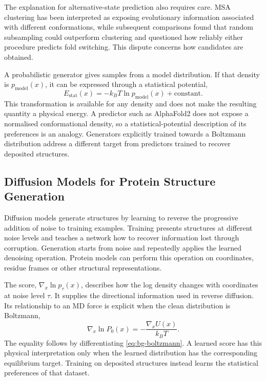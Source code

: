 The explanation for alternative-state prediction also requires care. MSA clustering has been interpreted as exposing evolutionary information associated with different conformations, while subsequent comparisons found that random subsampling could outperform clustering and questioned how reliably either procedure predicts fold switching.\supercite{wayment-steelePredictingMultipleConformations2024,schaferSequenceClusteringConfounds2024} This dispute concerns how candidates are obtained.

A probabilistic generator gives samples from a model distribution. If that density is $p_{\text{model}}(x)$, it can be expressed through a statistical potential,
\begin{equation}
    E_{\text{stat}}(x)=-k_BT\ln p_{\text{model}}(x)+\text{constant}.
    \label{eq:bg-statistical-potential}
\end{equation}
This transformation is available for any density and does not make the resulting quantity a physical energy.\supercite{bmsb2012ch2,bmsb2012ch4} A predictor such as AlphaFold2 does not expose a normalised conformational density, so a statistical-potential description of its preferences is an analogy. Generators explicitly trained towards a Boltzmann distribution address a different target from predictors trained to recover deposited structures.\supercite{noeBoltzmannGeneratorsSampling2019}

\subsection{Diffusion Models for Protein Structure Generation}
\label{sec:bg-diffusion}

Diffusion models generate structures by learning to reverse the progressive addition of noise to training examples. Training presents structures at different noise levels and teaches a network how to recover information lost through corruption. Generation starts from noise and repeatedly applies the learned denoising operation. Protein models can perform this operation on coordinates, residue frames or other structural representations.\supercite{yimDiffusionModelsProtein2024}

The score, $\nabla_x\ln p_\tau(x)$, describes how the log density changes with coordinates at noise level $\tau$. It supplies the directional information used in reverse diffusion. Its relationship to an MD force is explicit when the clean distribution is Boltzmann,
\begin{equation}
    \nabla_x\ln P_0(x)=-\frac{\nabla_x U(x)}{k_BT}.
    \label{eq:bg-boltzmann-score}
\end{equation}
The equality follows by differentiating \cref{eq:bg-boltzmann}. A learned score has this physical interpretation only when the learned distribution has the corresponding equilibrium target. Training on deposited structures instead learns the statistical preferences of that dataset.\supercite{bmsb2012ch3,yimDiffusionModelsProtein2024}

